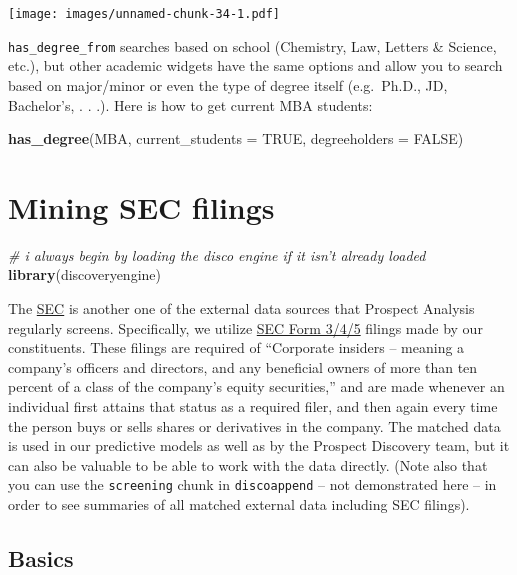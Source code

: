 \documentclass[]{book}
\newenvironment{Shaded}{\begin{snugshade}}{\end{snugshade}}
\newcommand{\CommentTok}[1]{\textcolor[rgb]{0.56,0.35,0.01}{\textit{#1}}}
\newcommand{\DataTypeTok}[1]{\textcolor[rgb]{0.13,0.29,0.53}{#1}}
\newcommand{\KeywordTok}[1]{\textcolor[rgb]{0.13,0.29,0.53}{\textbf{#1}}}
\newcommand{\NormalTok}[1]{#1}
\newcommand{\OtherTok}[1]{\textcolor[rgb]{0.56,0.35,0.01}{#1}}
\begin{document}
\texttt{[image: images/unnamed-chunk-34-1.pdf]}

\texttt{has\_degree\_from} searches based on school (Chemistry, Law, Letters \& Science, etc.), but other academic widgets have the same options and allow you to search based on major/minor or even the type of degree itself (e.g.~Ph.D., JD, Bachelor's, . . .). Here is how to get current MBA students:

\begin{Shaded}
\begin{Highlighting}[]
\KeywordTok{has_degree}\NormalTok{(MBA, }\DataTypeTok{current_students =} \OtherTok{TRUE}\NormalTok{, }\DataTypeTok{degreeholders =} \OtherTok{FALSE}\NormalTok{)}
\end{Highlighting}
\end{Shaded}

\hypertarget{ex-sec}{%
\chapter{Mining SEC filings}\label{ex-sec}}

\begin{Shaded}
\begin{Highlighting}[]
\CommentTok{# i always begin by loading the disco engine if it isn't already loaded}
\KeywordTok{library}\NormalTok{(discoveryengine)}
\end{Highlighting}
\end{Shaded}

The \href{https://www.sec.gov/}{SEC} is another one of the external data sources that Prospect Analysis regularly screens. Specifically, we utilize \href{https://www.sec.gov/fast-answers/answersform345htm.html}{SEC Form 3/4/5} filings made by our constituents. These filings are required of ``Corporate insiders -- meaning a company's officers and directors, and any beneficial owners of more than ten percent of a class of the company's equity securities,'' and are made whenever an individual first attains that status as a required filer, and then again every time the person buys or sells shares or derivatives in the company. The matched data is used in our predictive models as well as by the Prospect Discovery team, but it can also be valuable to be able to work with the data directly. (Note also that you can use the \texttt{screening} chunk in \texttt{discoappend} -- not demonstrated here -- in order to see summaries of all matched external data including SEC filings).

\hypertarget{basics-1}{%
\section{Basics}\label{basics-1}}
\end{document}
